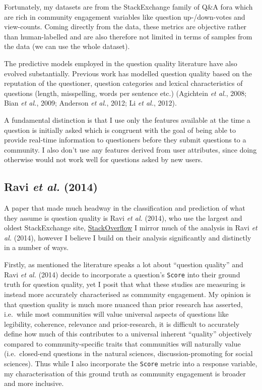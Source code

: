 \documentclass[11pt,preprint, authoryear]{article}
\numberwithin{equation}{section}
\begin{document}
Fortunately, my datasets are from the StackExchange family of Q\&A fora
which are rich in community engagement variables like question
up-/down-votes and view-counts. Coming directly from the data, these
metrics are objective rather than human-labelled and are also therefore
not limited in terms of samples from the data (we can use the whole
dataset).

The predictive models employed in the question quality literature have
also evolved substantially. Previous work has modelled question quality
based on the reputation of the questioner, question categories and
lexical characteristics of questions (length, misspelling, words per
sentence etc.) (Agichtein \emph{et al.}, 2008; Bian \emph{et al.}, 2009;
Anderson \emph{et al.}, 2012; Li \emph{et al.}, 2012).

A fundamental distinction is that I use only the features available at
the time a question is initially asked which is congruent with the goal
of being able to provide real-time information to questioners before
they submit questions to a community. I also don't use any features
derived from user attributes, since doing otherwise would not work well
for questions asked by new users.

\subsection{\texorpdfstring{Ravi \emph{et al.}
(2014)}{Ravi et al. (2014)}}\label{ravi2014}

A paper that made much headway in the classification and prediction of
what they assume is question quality is Ravi \emph{et al.} (2014), who
use the largest and oldest StackExchange site,
\href{https://stackoverflow.com}{StackOverflow} I mirror much of the
analysis in Ravi \emph{et al.} (2014), however I believe I build on
their analysis significantly and distinctly in a number of ways.

Firstly, as mentioned the literature speaks a lot about ``question
quality'' and Ravi \emph{et al.} (2014) decide to incorporate a
question's \texttt{Score} into their ground truth for question quality,
yet I posit that what these studies are measuring is instead more
accurately characterised as community engagement. My opinion is that
question quality is much more nuanced than prior research has asserted,
i.e.~while most communities will value universal aspects of questions
like legibility, coherence, relevance and prior-research, it is
difficult to accurately define how much of this contributes to a
universal inherent ``quality'' objectively compared to
community-specific traits that communities will naturally value
(i.e.~closed-end questions in the natural sciences, discussion-promoting
for social sciences). Thus while I also incorporate the \texttt{Score}
metric into a response variable, my characterisation of this ground
truth as community engagement is broader and more inclusive.
\end{document}
